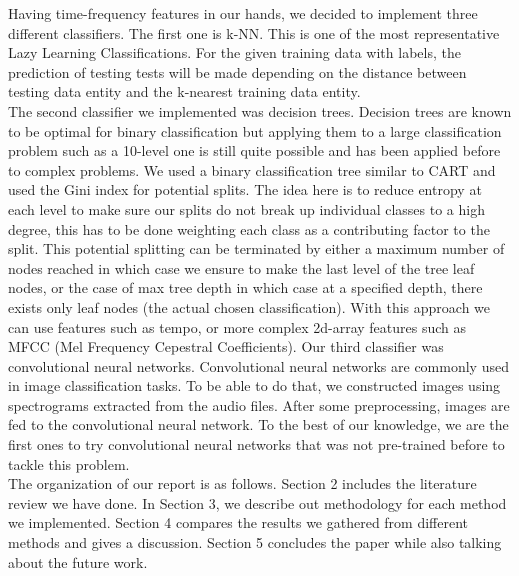 \documentclass[acmtog, authorversion]{acmart}
\begin{document}
Having time-frequency features in our hands, we decided to implement three different classifiers. The first one is k-NN. This is one of the most representative Lazy Learning Classifications. For the given training data with labels, the prediction of testing tests will be made depending on the distance between testing data entity and the k-nearest training data entity. \\
The second classifier we implemented was decision trees. Decision trees are known to be optimal for binary classification but applying them to a large classification problem such as a 10-level one is still quite possible and has been applied before to complex problems. We used a binary classification tree similar to CART and used the Gini index for potential splits. The idea here is to reduce entropy at each level to make sure our splits do not break up individual classes to a high degree, this has to be done weighting each class as a contributing factor to the split. This potential splitting can be terminated by either a maximum number of nodes reached in which case we ensure to make the last level of the tree leaf nodes, or the case of max tree depth in which case at a specified depth, there exists only leaf nodes (the actual chosen classification). With this approach we can use features such as tempo, or more complex 2d-array features such as MFCC (Mel Frequency Cepestral Coefficients). 
Our third classifier was convolutional neural networks. Convolutional neural networks are commonly used in image classification tasks. To be able to do that, 
we constructed images using spectrograms extracted from the audio files. After some preprocessing, images are fed to the convolutional neural network. 
To the best of our knowledge, we are the first ones to try convolutional neural networks that was not pre-trained before to tackle this problem.\\
The organization of our report is as follows. Section 2 includes the literature review we have done. In Section 3, we describe out methodology for each method
we implemented. Section 4 compares the results we gathered from different methods and gives a discussion. Section 5 concludes the paper while also talking about
the future work.
\end{document}
